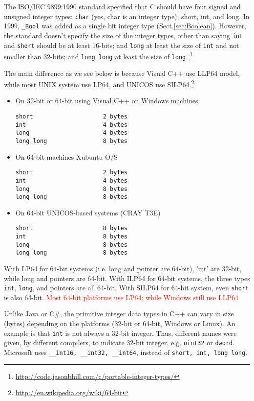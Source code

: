 The ISO/IEC 9899:1990 standard specified that C should have four signed and
unsigned integer types: \verb!char! (yes, char is an integer type), short, int,
and long. In 1999, \verb!_Bool! was added as a single bit integer type
(Sect.\ref{sec:Boolean}). However, the standard doesn't specify the size of the
integer types, other than saying \verb!int! and \verb!short! should be at least 16-bits;
and \verb!long! at least the size of \verb!int! and not smaller than 32-bits;
and \verb!long long! at least the size of \verb!long!.
\footnote{\url{http://code.jasonbhill.com/c/portable-integer-types/}}

The main difference as we see below is because Visual C++ use LLP64 model, while
most UNIX system use LP64, and UNICOS use
SILP64.\footnote{\url{http://en.wikipedia.org/wiki/64-bit}}
\begin{itemize}
  \item On 32-bit or 64-bit using Visual C++ on Windows machines: 
\begin{verbatim}
short                    2 bytes
int                      4 bytes
long                     4 bytes
long long                8 bytes
\end{verbatim}
  \item On 64-bit machines Xubuntu O/S
\begin{verbatim}
short                    2 bytes
int                      4 bytes
long                     8 bytes
long long                8 bytes
\end{verbatim}

   \item On 64-bit UNICOS-based systems (CRAY T3E)
\begin{verbatim}
short                    8 bytes
int                      8 bytes
long                     8 bytes
long long                8 bytes
\end{verbatim}
\end{itemize}
With LP64 for 64-bit systems (i.e. long and pointer are 64-bit), 'int' are
32-bit, while long and pointers are 64-bit. With ILP64 for 64-bit systems, the
three  types \verb!int!, \verb!long!,  and pointers are all 64-bit. With SILP64
for 64-bit system, even \verb!short!  is also 64-bit. \textcolor{red}{Most
64-bit platforms use LP64; while Windows still use LLP64}

Unlike Java or C\#, the primitive integer data types in C++ can vary in size
(bytes) depending on the platforms (32-bit or 64-bit, Windows or Linux). An
example is that \verb!int! is not always a 32-bit integer. Thus, different names
were given, by different compilers, to indicate 32-bit integer, e.g.
\verb!uint32! or \verb!dword!. Microsoft uses \verb!__int16, __int32, __int64!,
instead of \verb!short, int, long long!.

